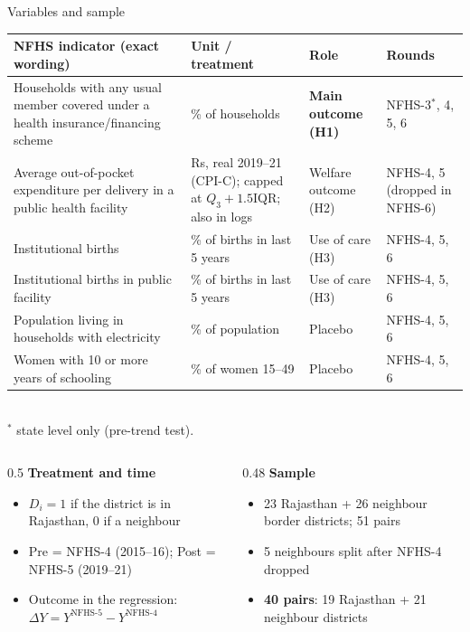 \documentclass[compress]{beamer}
\begin{document}
\begin{frame}[t]{Variables and sample}
\tiny
\renewcommand{\arraystretch}{1.15}
\begin{tabular}{@{}>{\raggedright\arraybackslash}p{4.0cm}>{\raggedright\arraybackslash}p{3.0cm}>{\raggedright\arraybackslash}p{1.8cm}>{\raggedright\arraybackslash}p{1.8cm}@{}}
\toprule
\textbf{NFHS indicator (exact wording)} & \textbf{Unit / treatment} & \textbf{Role} & \textbf{Rounds} \\
\midrule
Households with any usual member covered under a health insurance/financing scheme & \% of households & \textbf{Main outcome (H1)} & NFHS-3$^{*}$, 4, 5, 6 \\
Average out-of-pocket expenditure per delivery in a public health facility & Rs, real 2019--21 (CPI-C); capped at $Q_3{+}1.5$IQR; also in logs & Welfare outcome (H2) & NFHS-4, 5 (dropped in NFHS-6) \\
Institutional births & \% of births in last 5 years & Use of care (H3) & NFHS-4, 5, 6 \\
Institutional births in public facility & \% of births in last 5 years & Use of care (H3) & NFHS-4, 5, 6 \\
Population living in households with electricity & \% of population & Placebo & NFHS-4, 5, 6 \\
Women with 10 or more years of schooling & \% of women 15--49 & Placebo & NFHS-4, 5, 6 \\
\bottomrule
\end{tabular}
\\[1pt]{\tiny $^{*}$ state level only (pre-trend test).}

\vspace{4pt}
\scriptsize
\begin{columns}[T]
\begin{column}{0.5\textwidth}
\textbf{Treatment and time}
\begin{itemize}
\item $D_i = 1$ if the district is in Rajasthan, 0 if a neighbour
\item Pre = NFHS-4 (2015--16); Post = NFHS-5 (2019--21)
\item Outcome in the regression: $\Delta Y = Y^{\text{NFHS-5}} - Y^{\text{NFHS-4}}$
\end{itemize}
\end{column}
\begin{column}{0.48\textwidth}
\textbf{Sample}
\begin{itemize}
\item 23 Rajasthan + 26 neighbour border districts; 51 pairs
\item 5 neighbours split after NFHS-4 dropped
\item \textbf{40 pairs}: 19 Rajasthan + 21 neighbour districts
\end{itemize}
\end{column}
\end{columns}
\end{frame}
\end{document}
